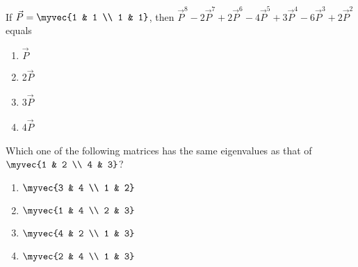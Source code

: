 \item If $\vec{P} = \myvec{1 & 1 \\ 1 & 1}$, then $\vec{P}^8 - 2\vec{P}^7 + 2\vec{P}^6 - 4\vec{P}^5 + 3\vec{P}^4 - 6\vec{P}^3 + 2\vec{P}^2$ equals
\hfill{}
\begin{multicols}{4}
\begin{enumerate}
\item $\vec{P}$
\item 2$\vec{P}$
\item 3$\vec{P}$
\item 4$\vec{P}$
\end{enumerate}
\end{multicols}
\item Which one of the following matrices has the same eigenvalues as that of $\myvec{1 & 2 \\ 4 & 3}$?

\hfill{}
\begin{multicols}{4}
\begin{enumerate}
\item $\myvec{3 & 4 \\ 1 & 2}$
\item $\myvec{1 & 4 \\ 2 & 3}$
\item $\myvec{4 & 2 \\ 1 & 3}$
\item $\myvec{2 & 4 \\ 1 & 3}$
\end{enumerate}
\end{multicols}

